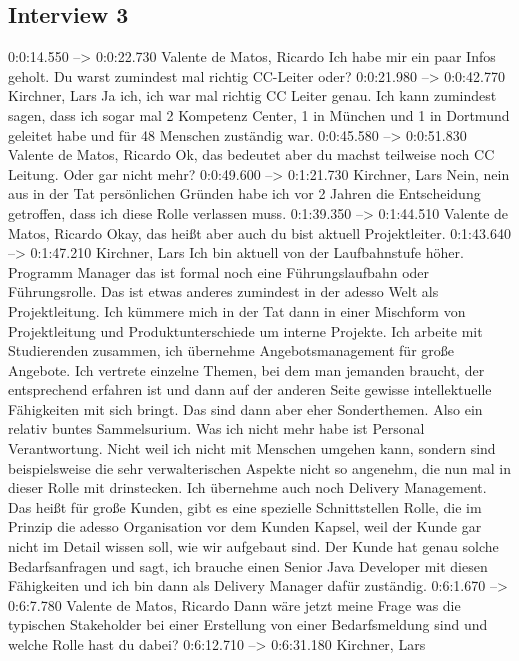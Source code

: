 \subsection{Interview 3}
0:0:14.550 --> 0:0:22.730
Valente de Matos, Ricardo
Ich habe mir ein paar Infos geholt. Du warst zumindest mal richtig CC-Leiter oder?
0:0:21.980 --> 0:0:42.770
Kirchner, Lars
Ja ich, ich war mal richtig CC Leiter genau. Ich kann zumindest sagen, dass ich sogar mal 2 Kompetenz Center, 1 in München und 1 in Dortmund geleitet habe und für 48 Menschen zuständig war.
0:0:45.580 --> 0:0:51.830
Valente de Matos, Ricardo
Ok, das bedeutet aber du machst teilweise noch CC Leitung. Oder gar nicht mehr?
0:0:49.600 --> 0:1:21.730
Kirchner, Lars
Nein, nein aus in der Tat persönlichen Gründen habe ich vor 2 Jahren die Entscheidung getroffen, dass ich diese Rolle verlassen muss.
0:1:39.350 --> 0:1:44.510
Valente de Matos, Ricardo
Okay, das heißt aber auch du bist aktuell Projektleiter.
0:1:43.640 --> 0:1:47.210
Kirchner, Lars
Ich bin aktuell von der Laufbahnstufe höher. Programm Manager das ist formal noch eine Führungslaufbahn oder Führungsrolle. Das ist etwas anderes zumindest in der adesso Welt als Projektleitung. Ich kümmere mich in der Tat dann in einer Mischform von Projektleitung und Produktunterschiede um interne Projekte. Ich arbeite mit Studierenden zusammen, ich übernehme Angebotsmanagement für große Angebote. Ich vertrete einzelne Themen, bei dem man jemanden braucht, der entsprechend erfahren ist und dann auf der anderen Seite gewisse intellektuelle Fähigkeiten mit sich bringt. Das sind dann aber eher Sonderthemen. Also ein relativ buntes Sammelsurium. Was ich nicht mehr habe ist Personal Verantwortung. Nicht weil ich nicht mit Menschen umgehen kann, sondern sind beispielsweise die sehr verwalterischen Aspekte nicht so angenehm, die nun mal in dieser Rolle mit drinstecken. Ich übernehme auch noch Delivery Management. Das heißt für große Kunden, gibt es eine spezielle Schnittstellen Rolle, die im Prinzip die adesso Organisation vor dem Kunden Kapsel, weil der Kunde gar nicht im Detail wissen soll, wie wir aufgebaut sind. Der Kunde hat genau solche Bedarfsanfragen und sagt, ich brauche einen Senior Java Developer mit diesen Fähigkeiten und ich bin dann als Delivery Manager dafür zuständig.
0:6:1.670 --> 0:6:7.780
Valente de Matos, Ricardo
Dann wäre jetzt meine Frage was die typischen Stakeholder bei einer Erstellung von einer Bedarfsmeldung sind und welche Rolle hast du dabei?
0:6:12.710 --> 0:6:31.180
Kirchner, Lars
